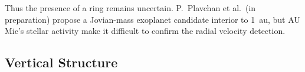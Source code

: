 \documentclass[modern]{aastex62}
\begin{document}
Thus the presence of a ring remains uncertain. 
P.~Plavchan et al.~(in preparation) propose a Jovian-mass exoplanet candidate interior to \SI{1}{au}, but AU Mic's stellar activity make it difficult to confirm the radial velocity detection.

\subsection{Vertical Structure}
\label{subsection: vertical discussion}
\end{document}
